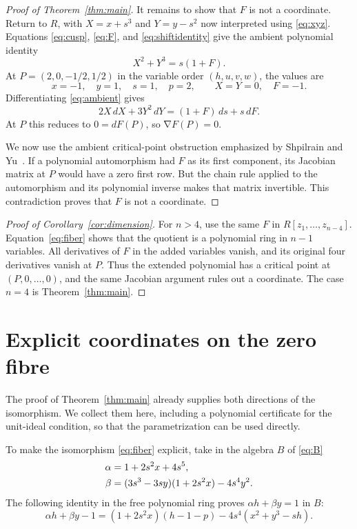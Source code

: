 \documentclass[11pt]{article}
\numberwithin{equation}{section}
\DeclareMathOperator{\grad}{\nabla}
\begin{document}
\begin{proof}[Proof of Theorem~\ref{thm:main}]
It remains to show that $F$ is not a coordinate. Return to $R$, with
$X=x+s^3$ and $Y=y-s^2$ now interpreted using \eqref{eq:xyz}.
Equations \eqref{eq:cusp}, \eqref{eq:F}, and \eqref{eq:shiftidentity} give
the ambient polynomial identity
\begin{equation}
  X^2+Y^3=s(1+F). \label{eq:ambient}
\end{equation}
At $P=(2,0,-1/2,1/2)$ in the variable order $(h,u,v,w)$, the values are
\[
  x=-1,\quad y=1,\quad s=1,\quad p=2,
  \qquad X=Y=0,\quad F=-1.
\]
Differentiating \eqref{eq:ambient} gives
\[
  2X\,dX+3Y^2\,dY=(1+F)\,ds+s\,dF.
\]
At $P$ this reduces to $0=dF(P)$, so $\grad F(P)=0$.

We now use the ambient critical-point obstruction emphasized by
Shpilrain and Yu~\cite[\S1]{SY}.
If a polynomial automorphism had $F$ as its first component, its Jacobian
matrix at $P$ would have a zero first row. But the chain rule applied to the
automorphism and its polynomial inverse makes that matrix invertible.
This contradiction proves that $F$ is not a coordinate.
\end{proof}

\begin{proof}[Proof of Corollary~\ref{cor:dimension}]
For $n>4$, use the same $F$ in $R[z_1,\ldots,z_{n-4}]$. Equation~\eqref{eq:fiber}
shows that the quotient is a polynomial ring in $n-1$ variables.
All derivatives of $F$ in the added variables vanish, and its original four
derivatives vanish at $P$. Thus the extended polynomial has a critical point
at $(P,0,\ldots,0)$, and the same Jacobian argument rules out a coordinate.
The case $n=4$ is Theorem~\ref{thm:main}.
\end{proof}

\appendix
\section{Explicit coordinates on the zero fibre}\label{app:coordinates}

The proof of Theorem~\ref{thm:main} already supplies both directions of the
isomorphism. We collect them here, including a polynomial certificate for the
unit-ideal condition, so that the parametrization can be used directly.

To make the isomorphism \eqref{eq:fiber} explicit, take in the algebra $B$ of
\eqref{eq:B}
\begin{align}
  \alpha&=1+2s^2x+4s^5,\notag\\
  \beta&=(3s^3-3sy)(1+2s^2x)-4s^4y^2. \label{eq:alphabeta}
\end{align}
The following identity in the free polynomial ring proves
$\alpha h+\beta y=1$ in $B$:
\begin{equation}
  \alpha h+\beta y-1
  =(1+2s^2x)(h-1-p)-4s^4(x^2+y^3-sh). \label{eq:certificate}
\end{equation}
\end{document}
